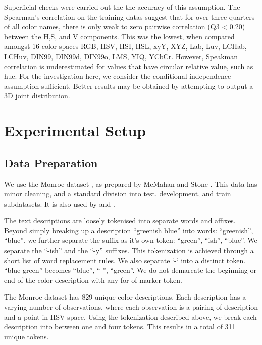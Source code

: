 \documentclass[]{article}
\begin{document}
Superficial checks were carried out the the accuracy of this assumption.
The Spearman's correlation on the training datas suggest that for over three quarters of all color names, there is only weak to zero pairwise correlation (Q3 < 0.20) between the H,S, and V components.
This was the lowest, when compared amongst 16 color spaces RGB, HSV, HSI, HSL, xyY, XYZ, Lab, Luv, LCHab, LCHuv, DIN99, DIN99d, DIN99o, LMS, YIQ, YCbCr.
However, Speakman correlation is underestimated for values that have circular relative value, such as hue.
For the investigation here, we consider the conditional independence assumption sufficient. Better results may be obtained by attempting to output a 3D joint distribution.

\section{Experimental Setup}
\subsection{Data Preparation}
We use the Monroe dataset \parencite{Monroe2010XKCDdataset}, as prepared by McMahan and Stone \parencite{mcmahan2015bayesian}.
This data has minor cleaning, and a standard division into test, development, and train subdatasets. It is also used by \textcite{2016arXiv160603821M} and \textcite{DBLP:journals/corr/KawakamiDRS16}.

The text descriptions are loosely tokenised into separate words and affixes.
Beyond simply breaking up a description ``greenish blue'' into words: ``greenish'', ``blue'', we further separate the suffix as it's own token: ``green'', ``ish'', ``blue''.
We separate the ``-ish'' and the ``-y'' suffixes.
This tokenization is achieved through a short list of word replacement rules.
We also separate `-` into a distinct token. ``blue-green'' becomes ``blue'', ``-'', ``green''.
We do not demarcate the beginning or end of the color description with any for of marker token.

The Monroe dataset has 829 unique color descriptions.
Each description has a varying number of observations, where each observation is a pairing of description and a point in HSV space.
Using the tokenization described above, we break each description into between one and four tokens.
This results in a total of 311 unique tokens.
\end{document}
